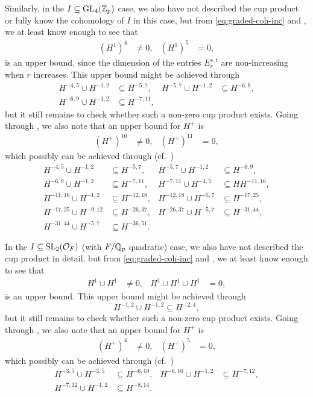 Similarly, in the $I \subseteq \operatorname{GL}_{4}(\mathbb{Z}_{p})$ case, we also have not described the cup product or fully know the cohomology of $I$ in this case, but from \eqref{eq:graded-coh-inc} and , we at least know enough to see that
\begin{align*}
  (H^{1})^{4} &\neq 0, & (H^{1})^{5} &= 0,
\end{align*}
is an upper bound, since the dimension of the entries $E_{r}^{s,t}$ are non-increasing when $r$ increases. This upper bound might be achieved through
\begin{align*}
  H^{-4,5} \cup H^{-1,2} &\subseteq H^{-5,7}, & H^{-5,7} \cup H^{-1,2} &\subseteq H^{-6,9}, \\
  H^{-6,9} \cup H^{-1,2} &\subseteq H^{-7,11},
\end{align*}
but it still remains to check whether such a non-zero cup product exists. Going through , we also note that an upper bound for $H^{+}$ is
\begin{align*}
  (H^{+})^{10} &\neq 0, & (H^{+})^{11} &= 0,
\end{align*}
which possibly can be achieved through (cf.\ \cite{code})
\begin{align*}
  H^{-4,5} \cup H^{-1,2} &\subseteq H^{-5,7}, & H^{-5,7} \cup H^{-1,2} &\subseteq H^{-6,9}, \\
  H^{-6,9} \cup H^{-1,2} &\subseteq H^{-7,11}, & H^{-7,11} \cup H^{-4,5} &\subseteq HH^{-11,16}, \\
  H^{-11,16} \cup H^{-1,2} &\subseteq H^{-12,18}, & H^{-12,18} \cup H^{-5,7} &\subseteq H^{-17,25}, \\
  H^{-17,25} \cup H^{-9,12} &\subseteq H^{-26,37}, & H^{-26,37} \cup H^{-5,7} &\subseteq H^{-31,44}, \\
  H^{-31,44} \cup H^{-5,7} &\subseteq H^{-36,51}.
\end{align*}

In the $I \subseteq \operatorname{SL}_{2}(\mathcal{O}_{F})$ (with $F/\mathbb{Q}_{p}$ quadratic) case, we also have not described the cup product in detail, but from \eqref{eq:graded-coh-inc} and , we at least know enough to see that
\begin{align*}
  H^{1} \cup H^{1} &\neq 0, & H^{1} \cup H^{1} \cup H^{1} &= 0,
\end{align*}
is an upper bound. This upper bound might be achieved through
\begin{equation*}
  H^{-1,2} \cup H^{-1,2} \subseteq H^{-2,4},
\end{equation*}
but it still remains to check whether such a non-zero cup product exists. Going through , we also note that an upper bound for $H^{+}$ is
\begin{align*}
  (H^{+})^{4} &\neq 0, & (H^{+})^{5} &= 0,
\end{align*}
which possibly can be achieved through (cf.\ \cite{code})
\begin{align*}
  H^{-3,5} \cup H^{-3,5} &\subseteq H^{-6,10}, & H^{-6,10} \cup H^{-1,2} &\subseteq H^{-7,12}, \\
  H^{-7,12} \cup H^{-1,2} &\subseteq H^{-8,14}.
\end{align*}

